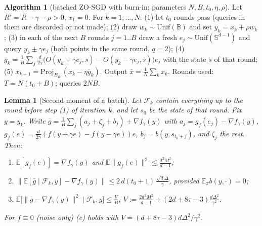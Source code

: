 \documentclass[11pt,a4paper]{article}
\numberwithin{equation}{section}
\newtheorem{lemma}[theorem]{Lemma}
\theoremstyle{definition}
\theoremstyle{remark}
\newcommand{\E}{\mathbb E}\newcommand{\R}{\mathbb R}\newcommand{\N}{\mathbb N}\newcommand{\Prob}{\mathbb P}
\newcommand{\norm}[1]{\lVert #1\rVert}\newcommand{\abs}[1]{\lvert #1\rvert}\newcommand{\ip}[2]{\langle #1,#2\rangle}
\newcommand{\Unif}{\mathrm{Unif}}\newcommand{\TV}{\mathrm{TV}}\newcommand{\tmix}{t_{\rm mix}}
\newcommand{\Sph}{\mathbb S^{d-1}}\newcommand{\Ball}{\mathbb B}
\begin{document}
\noindent\textbf{Algorithm 1} (batched ZO-SGD with burn-in; parameters $N,B,t_0,\eta,\rho$). Let $R'=R-\gamma-\rho>0$, $x_1=0$. For $k=1,\dots,N$:
(1) let $t_0$ rounds pass (queries in them are discarded or not made);
(2) draw $w_k\sim\Unif(\Ball)$ and set $y_k=x_k+\rho w_k$;
(3) in each of the next $B$ rounds $j=1..B$ draw a fresh $e_j\sim\Unif(\Sph)$ and query $y_k\pm\gamma e_j$ (both points in the same round, $q=2$);
(4) $\bar g_k=\frac1B\sum_j\frac d{2\gamma}\big(O(y_k+\gamma e_j,s)-O(y_k-\gamma e_j,s)\big)e_j$ with the state $s$ of that round;
(5) $x_{k+1}=\mathrm{Proj}_{B_{R'}}(x_k-\eta\bar g_k)$.
Output $\bar x=\frac1N\sum_kx_k$. Rounds used: $T=N(t_0+B)$; queries $2NB$.

\begin{lemma}[Second moment of a batch]\label{lem:var}
Let $\mathcal F_k$ contain everything up to the round before step (1) of iteration $k$, and let $s_0$ be the state of that round. Fix $y=y_k$. Write $\bar g=\frac1B\sum_j(a_j+\zeta_j+b_j)+\nabla f_\gamma(y)$ with $a_j=g_f(e_j)-\nabla f_\gamma(y)$, $g_f(e)=\frac d{2\gamma}(f(y+\gamma e)-f(y-\gamma e))e$, $b_j=b(y,s_{t_0+j})$, and $\zeta_j$ the rest. Then:
\begin{enumerate}[label=(\alph*)]
\item $\E[g_f(e)]=\nabla f_\gamma(y)$ and $\E\norm{g_f(e)}^2\le\frac{d^2M^2}{d-1}$;
\item $\big\|\E[\bar g\mid\mathcal F_k,y]-\nabla f_\gamma(y)\big\|\le2\,d(t_0+1)\,\frac{\sqrt d\Delta}\gamma$, provided $\E_\pi b(y,\cdot)=0$;
\item $\E\big[\norm{\bar g-\nabla f_\gamma(y)}^2\mid\mathcal F_k,y\big]\le\frac VB$, \quad $V:=\frac{2d^2M^2}{d-1}+(2d+8\tau-3)\frac{d\Delta^2}{\gamma^2}$.
\end{enumerate}
For $f\equiv0$ (noise only) (c) holds with $V=(d+8\tau-3)d\Delta^2/\gamma^2$.
\end{lemma}
\end{document}
